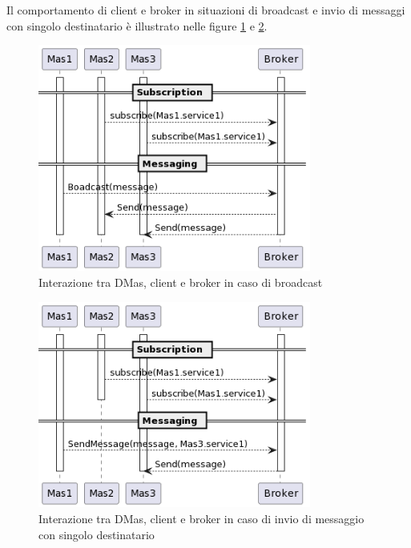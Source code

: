 Il comportamento di client e broker in situazioni di broadcast e invio di messaggi con singolo destinatario è illustrato nelle figure \ref{fig:interaction-broadcast} e \ref{fig:interaction-sendmessage}.

\begin{figure}[ht!]
    \centering
    \includegraphics[width=0.8\textwidth]{figures/interaction-broadcast.png}
    \caption{Interazione tra DMas, client e broker in caso di broadcast}
    \label{fig:interaction-broadcast}
\end{figure}

\begin{figure}[ht!]
    \centering
    \includegraphics[width=0.8\textwidth]{figures/interaction-sendmessage.png}
    \caption{Interazione tra DMas, client e broker in caso di invio di messaggio con singolo destinatario}
    \label{fig:interaction-sendmessage}
\end{figure}

